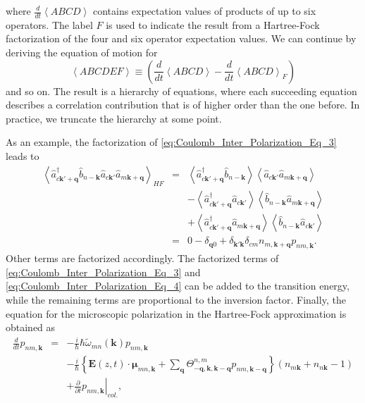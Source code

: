 where $\frac{d}{dt}\left\langle ABCD\right\rangle $ contains expectation
values of products of up to six operators. The label $F$ is used
to indicate the result from a Hartree-Fock factorization of the four
and six operator expectation values. We can continue by deriving the
equation of motion for \begin{equation}
\left\langle ABCDEF\right\rangle \equiv\left(\frac{d}{dt}\left\langle ABCD\right\rangle -\frac{d}{dt}\left\langle ABCD\right\rangle _{F}\right)\end{equation}
and so on. The result is a hierarchy of equations, where each succeeding
equation describes a correlation contribution that is of higher order
than the one before. In practice, we truncate the hierarchy at some
point. 

As an example, the factorization of \ref{eq:Coulomb_Inter_Polarization_Eq_3}
leads to\begin{eqnarray*}
\left\langle \hat{a}_{c\mathbf{k}'+\mathbf{q}}^{\dagger}\hat{b}_{n-\mathbf{k}}\hat{a}_{c\mathbf{k}'}\hat{a}_{m\mathbf{k}+\mathbf{q}}\right\rangle _{HF} & = & \left\langle \hat{a}_{c\mathbf{k}'+\mathbf{q}}^{\dagger}\hat{b}_{n-\mathbf{k}}\right\rangle \left\langle \hat{a}_{c\mathbf{k}'}\hat{a}_{m\mathbf{k}+\mathbf{q}}\right\rangle \\
 &  & -\left\langle \hat{a}_{c\mathbf{k}'+\mathbf{q}}^{\dagger}\hat{a}_{c\mathbf{k}'}\right\rangle \left\langle \hat{b}_{n-\mathbf{k}}\hat{a}_{m\mathbf{k}+\mathbf{q}}\right\rangle \\
 &  & +\left\langle \hat{a}_{c\mathbf{k}'+\mathbf{q}}^{\dagger}\hat{a}_{m\mathbf{k}+\mathbf{q}}\right\rangle \left\langle \hat{b}_{n-\mathbf{k}}\hat{a}_{c\mathbf{k}'}\right\rangle \\
 & = & 0-\delta_{\mathbf{q}0}+\delta_{\mathbf{k}'\mathbf{k}}\delta_{cm}n_{m,\mathbf{k}+\mathbf{q}}p_{nm,\mathbf{k}}.\end{eqnarray*}
Other terms are factorized accordingly. The factorized terms of \ref{eq:Coulomb_Inter_Polarization_Eq_3}
and \ref{eq:Coulomb_Inter_Polarization_Eq_4} can be added to the
transition energy, while the remaining terms are proportional to the
inversion factor. Finally, the equation for the microscopic polarization
in the Hartree-Fock approximation is obtained as\begin{eqnarray}
\frac{d}{dt}p_{nm,\mathbf{k}} & = & -\frac{i}{\hbar}\hbar\tilde{\omega}_{mn}(\mathbf{k})p_{nm,\mathbf{k}}\nonumber \\
 &  & -\frac{i}{\hbar}\left\{ \mathbf{E}(z,t)\cdot\boldsymbol{\mu}_{mn,\mathbf{k}}+\sum_{\mathbf{q}}\Theta_{-\mathbf{q},\mathbf{k},\mathbf{k}-\mathbf{q}}^{n,m}p_{nm,\mathbf{k}-\mathbf{q}}\right\} \left(n_{m\mathbf{k}}+n_{n\mathbf{k}}-1\right)\nonumber \\
 &  & +\frac{\partial}{\partial t}\left.p_{nm,\mathbf{k}}\right|_{col.},\label{eq:HF_Polarization_Eq_Motion}\end{eqnarray}
